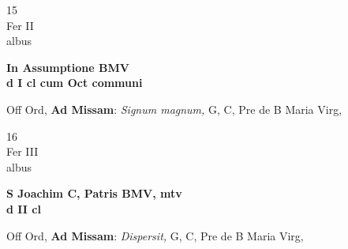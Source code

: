 \documentclass[10pt, openany]{book}
\begin{document}
        \begin{center}
            \begin{minipage}{3.5in}
                \vspace{2em}
                \begin{minipage}{0.5in}
                    {\Huge 15} \\
                    {\normalsize Fer II} \\
                    {\normalsize albus}
                \end{minipage}
                \begin{minipage}{3.0in}
                    \textbf{ \large In Assumptione BMV \\
                    \textnormal{\normalsize d I cl cum Oct communi}} \\ 
                \end{minipage}
                \begin{justify}Off Ord, \textbf{Ad Missam}: \textit{Signum magnum,} G, C, Pre de B Maria Virg,   
                \end{justify}
            \end{minipage}
        \end{center}
    
        \begin{center}
            \begin{minipage}{3.5in}
                \vspace{2em}
                \begin{minipage}{0.5in}
                    {\Huge 16} \\
                    {\normalsize Fer III} \\
                    {\normalsize albus}
                \end{minipage}
                \begin{minipage}{3.0in}
                    \textbf{ \large S Joachim C, Patris BMV, mtv \\
                    \textnormal{\normalsize d II cl}} \\ 
                \end{minipage}
                \begin{justify}Off Ord, \textbf{Ad Missam}: \textit{Dispersit,} G, C, Pre de B Maria Virg,   
                \end{justify}
            \end{minipage}
        \end{center}
    
\end{document}
